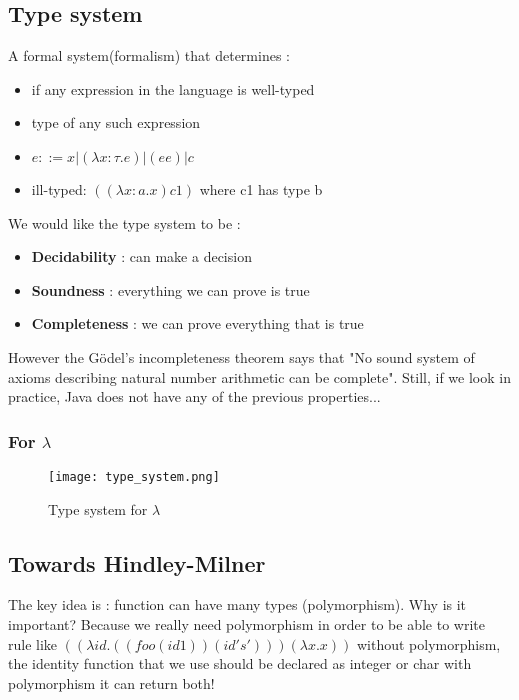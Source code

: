     \subsection{Type system}
        \theoremstyle{definition}
        \begin{definition}
            A formal system(formalism) that determines :
            \begin{itemize}
                \item if any expression in the language is well-typed
                \item type of any such expression
                \item $e::= x | (\lambda x:\tau .e) | (e e) | c$
                \item ill-typed: $((\lambda x:a . x) c1)$ where c1 has type b
            \end{itemize}
        \end{definition}

        We would like the type system to be :
        \begin{itemize}
            \item \textbf{Decidability} : can make a decision
            \item \textbf{Soundness} : everything we can prove is true
            \item \textbf{Completeness} : we can prove everything that is true
        \end{itemize}
        However the Gödel's incompleteness theorem says that "No sound system of
        axioms describing natural number arithmetic can be complete". Still, if
        we look in practice, Java does not have any of the previous properties... 

        \subsubsection{For $\lambda$}
            \begin{figure}[H]
                 \centering
                 \texttt{[image: type\_system.png]}
                 \caption{Type system for $\lambda$}
                 \label{fig:type_system}
            \end{figure}
    \subsection{Towards Hindley-Milner}
        The key idea is : function can have many types (polymorphism). Why is it
        important? Because we really need polymorphism in order to be able to
        write rule like $((\lambda id . ((foo (id 1)) (id 's'))) (\lambda x .
        x))$ without polymorphism, the identity function that we use should be
        declared as integer or char with polymorphism it can return both!

